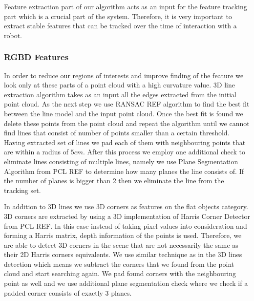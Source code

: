 Feature extraction part of our algorithm acts as an input for the feature tracking part which is a crucial part of the system. Therefore, it is very important to extract stable features that can be tracked over the time of interaction with a robot.




\subsubsection{RGBD Features}
\label{sec:3dfeatures}
In order to reduce our regions of interests and improve finding of the feature we look only at these parts of a point cloud with a high curvature value. 3D line extraction algorithm takes as an input all the edges extracted from the initial point cloud. As the next step we use RANSAC REF algorithm to find the best fit between the line model and the input point cloud. Once the best fit is found we delete these points from the point cloud and repeat the algorithm until we cannot find lines that consist of number of points smaller than a certain threshold. Having extracted set of lines we pad each of them with neighbouring points that are within a radius of $5cm$. After this process we employ one additional check to eliminate lines consisting of multiple lines, namely we use Plane Segmentation Algorithm from PCL REF to determine how many planes the line consists of. If the number of planes is bigger than 2 then we eliminate the line from the tracking set.

In addition to 3D lines we use 3D corners as features on the flat objects category. 3D corners are extracted by using a 3D implementation of Harris Corner Detector from PCL REF. In this case instead of taking pixel values into consideration and forming a Harris matrix, depth information of the points is used. Therefore, we are able to detect 3D corners in the scene that are not necessarily the same as their 2D Harris corners equivalents. We use similar technique as in the 3D lines detection which means we subtract        the corners that we found from the point cloud and start searching again. We pad found corners with the neighbouring point as well and we use additional plane segmentation check where we check if a padded corner consists of exactly 3 planes.

